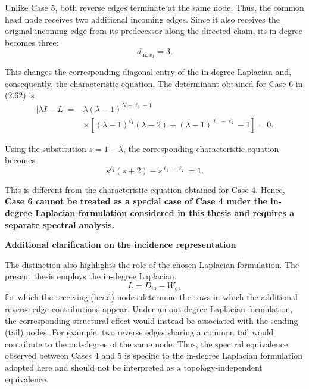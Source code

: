\documentclass[11pt,a4paper]{article}
\begin{document}
Unlike Case 5, both reverse edges terminate at the same node. Thus, the common head node receives two additional incoming edges. Since it also receives the original incoming edge from its predecessor along the directed chain, its in-degree becomes three:
\begin{equation}
    d_{\mathrm{in},x_1}=3.
\end{equation}

This changes the corresponding diagonal entry of the in-degree Laplacian and, consequently, the characteristic equation. The determinant obtained for Case 6 in (2.62) is
\begin{equation}
\begin{aligned}
    |\lambda I-L|
    ={}&\lambda(\lambda-1)^{N-\ell_1-1}\\
    &\times\left[
    (\lambda-1)^{\ell_1}(\lambda-2)
    +(\lambda-1)^{\ell_1-\ell_2}-1
    \right]=0.
\end{aligned}
\tag{2.62}
\end{equation}

Using the substitution $s=1-\lambda$, the corresponding characteristic equation becomes
\begin{equation}
    s^{\ell_1}(s+2)-s^{\ell_1-\ell_2}=1.
    \tag{2.61}
\end{equation}

This is different from the characteristic equation obtained for Case 4. Hence, \textbf{Case 6 cannot be treated as a special case of Case 4 under the in-degree Laplacian formulation considered in this thesis and requires a separate spectral analysis.}

\medskip
\noindent
\textbf{Additional clarification on the incidence representation}

The distinction also highlights the role of the chosen Laplacian formulation. The present thesis employs the in-degree Laplacian,
\begin{equation}
    L=D_{\mathrm{in}}-W_g,
\end{equation}
for which the receiving (head) nodes determine the rows in which the additional reverse-edge contributions appear. Under an out-degree Laplacian formulation, the corresponding structural effect would instead be associated with the sending (tail) nodes. For example, two reverse edges sharing a common tail would contribute to the out-degree of the same node. Thus, the spectral equivalence observed between Cases 4 and 5 is specific to the in-degree Laplacian formulation adopted here and should not be interpreted as a topology-independent equivalence.
\end{document}
